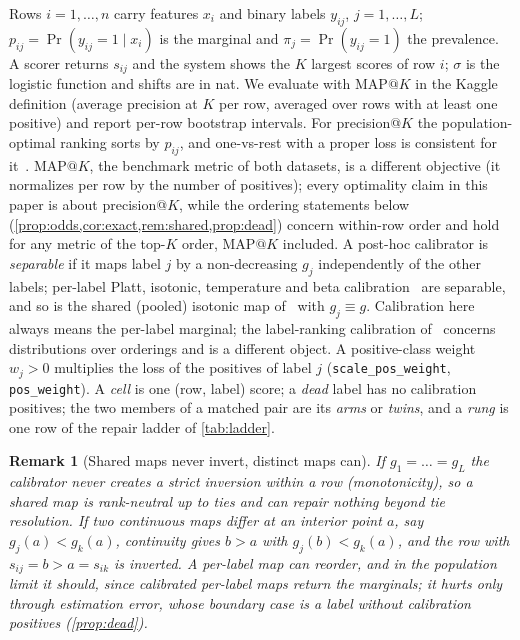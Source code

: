 \documentclass[sigconf,nonacm]{acmart}
\makeatletter
\newtheorem{remark}{Remark}
\newcommand{\mapk}{\mathrm{MAP}@K\xspace}
\makeatother
\begin{document}
Rows $i=1,\dots,n$ carry features $x_i$ and binary labels $y_{ij}$, $j=1,\dots,L$; $p_{ij}=\Pr(y_{ij}=1\mid x_i)$ is the marginal and $\pi_j=\Pr(y_{ij}=1)$ the prevalence. A scorer returns $s_{ij}$ and the system shows the $K$ largest scores of row $i$; $\sigma$ is the logistic function and shifts are in nat. We evaluate with $\mapk$ in the Kaggle definition (average precision at $K$ per row, averaged over rows with at least one positive) and report per-row bootstrap intervals. For precision@$K$ the population-optimal ranking sorts by $p_{ij}$, and one-vs-rest with a proper loss is consistent for it~\cite{Koyejo2015Consistent,Menon2019Reductions}. $\mapk$, the benchmark metric of both datasets, is a different objective (it normalizes per row by the number of positives); every optimality claim in this paper is about precision@$K$, while the ordering statements below (\cref{prop:odds,cor:exact,rem:shared,prop:dead}) concern within-row order and hold for any metric of the top-$K$ order, $\mapk$ included. A post-hoc calibrator is \emph{separable} if it maps label $j$ by a non-decreasing $g_j$ independently of the other labels; per-label Platt, isotonic, temperature and beta calibration~\cite{Platt1999,Zadrozny2002,Guo2017Calibration,Kull2017Beta} are separable, and so is the shared (pooled) isotonic map of~\cite{Ullah2025XMLCCalib} with $g_j\equiv g$. Calibration here always means the per-label marginal; the label-ranking calibration of~\cite{Thies2026LabelRankingCalib} concerns distributions over orderings and is a different object. A positive-class weight $w_j>0$ multiplies the loss of the positives of label $j$ (\texttt{scale\_pos\_weight}, \texttt{pos\_weight}). A \emph{cell} is one (row, label) score; a \emph{dead} label has no calibration positives; the two members of a matched pair are its \emph{arms} or \emph{twins}, and a \emph{rung} is one row of the repair ladder of \cref{tab:ladder}.

\begin{remark}[Shared maps never invert, distinct maps can]
\label{rem:shared}
If $g_1=\dots=g_L$ the calibrator never creates a strict inversion within a row (monotonicity), so a shared map is rank-neutral up to ties and can repair nothing beyond tie resolution. If two continuous maps differ at an interior point $a$, say $g_j(a)<g_k(a)$, continuity gives $b>a$ with $g_j(b)<g_k(a)$, and the row with $s_{ij}=b>a=s_{ik}$ is inverted. A per-label map can reorder, and in the population limit it should, since calibrated per-label maps return the marginals; it hurts only through estimation error, whose boundary case is a label without calibration positives (\cref{prop:dead}).
\end{remark}
\end{document}
